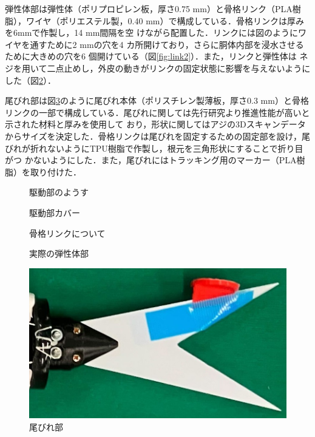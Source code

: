 弾性体部は弾性体（ポリプロピレン板，厚さ0.75 mm）と骨格リンク（PLA樹脂），ワイヤ（ポリエステル製，0.40 mm）で構成している．骨格リンクは厚みを6mmで作製し，14 mm間隔を空
けながら配置した．リンクには図のようにワイヤを通すために2 mmの穴を4 カ所開けており，さらに胴体内部を浸水させるために大きめの穴を6 個開けている（図\ref{fig:link2}）．また，リンクと弾性体は
ネジを用いて二点止めし，外皮の動きがリンクの固定状態に影響を与えないようにした（図\ref{fig:real_link}）．

尾びれ部は図\ref{fig:obire}のように尾びれ本体（ポリスチレン製薄板，厚さ0.3 mm）と骨格リンクの一部で構成している．尾びれに関しては先行研究\cite{ni}より推進性能が高いと示された材料と厚みを使用して
おり，形状に関してはアジの3Dスキャンデータからサイズを決定した．骨格リンクは尾びれを固定するための固定部を設け，尾びれが折れないようにTPU樹脂で作製し，根元を三角形状にすることで折り目がつ
かないようにした．また，尾びれにはトラッキング用のマーカー（PLA樹脂）を取り付けた．

\begin{figure}[t]
    \centering
    \begin{minipage}[b]{0.35\linewidth}
        \centering
        \caption{駆動部のようす}
        \label{fig:kudou}
    \end{minipage}
    \hspace{0.1\linewidth}
    \begin{minipage}[b]{0.35\linewidth}
        \centering
        \caption{駆動部カバー}
        \label{fig:cover}
    \end{minipage}
\end{figure}
\begin{figure}[t]
    \centering
    \begin{minipage}[b]{0.35\linewidth}
        \centering
        \caption{骨格リンクについて}
        \label{fig:link2}
    \end{minipage}
    \hspace{0.1\linewidth}
    \begin{minipage}[b]{0.35\linewidth}
        \centering
        \caption{実際の弾性体部}
        \label{fig:real_link}
    \end{minipage}
\end{figure}
\begin{figure}[t]
    \centering
    \includegraphics[width=0.6\linewidth]{chapters/picture/obire.jpg}
    \caption{尾びれ部}
    \label{fig:obire}
\end{figure}

